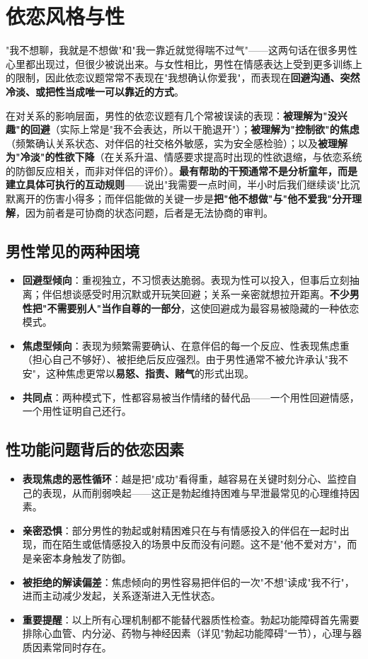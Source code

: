 \section{依恋风格与性}

"我不想聊，我就是不想做"和"我一靠近就觉得喘不过气"——这两句话在很多男性心里都出现过，但很少被说出来。与女性相比，男性在情感表达上受到更多训练上的限制，因此依恋议题常常不表现在"我想确认你爱我"，而表现在\textbf{回避沟通、突然冷淡、或把性当成唯一可以靠近的方式}。


在对关系的影响层面，男性的依恋议题有几个常被误读的表现：\textbf{被理解为"没兴趣"的回避}（实际上常是"我不会表达，所以干脆退开"）；\textbf{被理解为"控制欲"的焦虑}（频繁确认关系状态、对伴侣的社交格外敏感，实为安全感检验）；以及\textbf{被理解为"冷淡"的性欲下降}（在关系升温、情感要求提高时出现的性欲退缩，与依恋系统的防御反应相关，而非对伴侣的评价）。\textbf{最有帮助的干预通常不是分析童年，而是建立具体可执行的互动规则}——说出"我需要一点时间，半小时后我们继续谈"比沉默离开的伤害小得多；而伴侣能做的关键一步是\textbf{把"他不想做"与"他不爱我"分开理解}，因为前者是可协商的状态问题，后者是无法协商的审判。

\subsection{男性常见的两种困境}

\begin{itemize}
	\item \textbf{回避型倾向}：重视独立，不习惯表达脆弱。表现为性可以投入，但事后立刻抽离；伴侣想谈感受时用沉默或开玩笑回避；关系一亲密就想拉开距离。\textbf{不少男性把"不需要别人"当作自尊的一部分}，这使回避成为最容易被隐藏的一种依恋模式。
	\item \textbf{焦虑型倾向}：表现为频繁需要确认、在意伴侣的每一个反应、性表现焦虑重（担心自己不够好）、被拒绝后反应强烈。由于男性通常不被允许承认"我不安"，这种焦虑更常以\textbf{易怒、指责、赌气}的形式出现。
	\item \textbf{共同点}：两种模式下，性都容易被当作情绪的替代品——一个用性回避情感，一个用性证明自己还行。
\end{itemize}

\subsection{性功能问题背后的依恋因素}

\begin{itemize}
	\item \textbf{表现焦虑的恶性循环}：越是把"成功"看得重，越容易在关键时刻分心、监控自己的表现，从而削弱唤起——这正是勃起维持困难与早泄最常见的心理维持因素。
	\item \textbf{亲密恐惧}：部分男性的勃起或射精困难只在与有情感投入的伴侣在一起时出现，而在陌生或低情感投入的场景中反而没有问题。这不是"他不爱对方"，而是亲密本身触发了防御。
	\item \textbf{被拒绝的解读偏差}：焦虑倾向的男性容易把伴侣的一次"不想"读成"我不行"，进而主动减少发起，关系逐渐进入无性状态。
	\item \textbf{重要提醒}：以上所有心理机制都不能替代器质性检查。勃起功能障碍首先需要排除心血管、内分泌、药物与神经因素（详见"勃起功能障碍"一节），心理与器质因素常同时存在。
\end{itemize}

